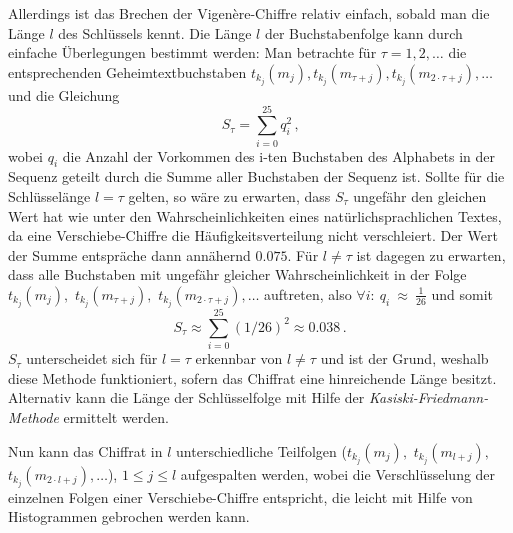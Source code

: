Allerdings ist das Brechen der Vigen\`ere-Chiffre relativ einfach, sobald man die Länge $l$ des Schlüssels kennt. Die Länge $l$ der Buchstabenfolge kann durch einfache Überlegungen bestimmt werden: Man betrachte für $\tau = 1,2,\ldots$ die entsprechenden Geheimtextbuchstaben $t_{k_j}(m_j),t_{k_j}(m_{\tau+j}),t_{k_j}(m_{2 \cdot \tau+j}),\ldots$ und die Gleichung
\begin{equation*}
	S_{\tau}=	\sum_{i=0}^{25} q^2_i \, \text{,}
\end{equation*}
wobei $q_i$ die Anzahl der Vorkommen des i-ten Buchstaben des Alphabets in der Sequenz geteilt durch die Summe aller Buchstaben der Sequenz ist. Sollte für die
Schlüsselänge $l = \tau$ gelten, so wäre zu erwarten, dass $S_{\tau}$ ungefähr den gleichen Wert hat wie unter den Wahrscheinlichkeiten eines
natürlichsprachlichen Textes, da eine Verschiebe-Chiffre die Häufigkeitsverteilung nicht verschleiert. Der Wert der Summe entspräche dann annähernd $0.075$.
Für $l \neq \tau$ ist dagegen zu erwarten, dass alle Buchstaben mit ungefähr gleicher Wahrscheinlichkeit in der Folge $t_{k_j}(m_j),$ $t_{k_j}(m_{\tau+j}),$ $t_{k_j}(m_{2 \cdot \tau+j}),\ldots$ auftreten, also $\forall i\colon~q_i~\approx~\frac{1}{26}$ und somit
\begin{equation*}
	S_{\tau} \approx \sum_{i=0}^{25} (1/26)^2 \approx 0.038 \,\text{.}
\end{equation*}
$S_{\tau}$ unterscheidet sich für $l = \tau$ erkennbar von $l \neq \tau$ und ist der Grund, weshalb diese Methode funktioniert, sofern das Chiffrat eine hinreichende Länge besitzt. Alternativ kann die Länge der Schlüsselfolge mit Hilfe der \emph{Kasiski-Friedmann-Methode} \cite{Kasiski1863} ermittelt werden.

Nun kann das Chiffrat in $l$ unterschiedliche Teilfolgen ($t_{k_j}(m_j),$ $t_{k_j}(m_{l+j}),$ $t_{k_j}(m_{2 \cdot l+j}),\ldots$), $1 \leq j \leq l$ aufgespalten werden, wobei die Verschlüsselung der einzelnen Folgen einer Verschiebe-Chiffre entspricht, die leicht mit Hilfe von Histogrammen gebrochen werden kann.

